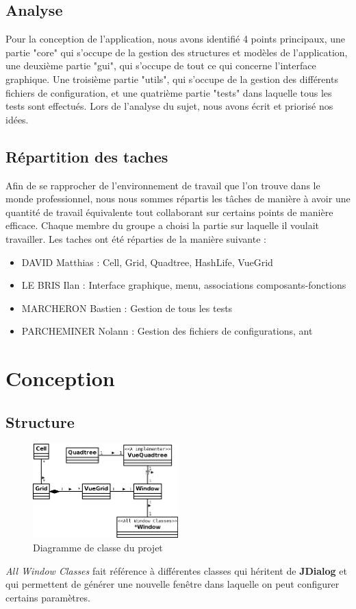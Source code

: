 \documentclass[12pt]{article}
\begin{document}
		\subsection{Analyse}
			Pour la conception de l’application, nous avons identifié 4 points principaux, une partie "core" qui s’occupe de la gestion des structures et modèles de l’application, une deuxième partie "gui", qui s’occupe de tout ce qui concerne l’interface graphique. Une troisième partie "utils", qui s'occupe de la gestion des différents fichiers de configuration, et une quatrième partie "tests" dans laquelle tous les tests sont effectués. Lors de l’analyse du sujet, nous avons écrit et priorisé nos idées.
		\subsection{Répartition des taches}
			Afin de se rapprocher de l'environnement de travail que l'on trouve dans le monde professionnel, nous nous sommes répartis les tâches de manière à avoir une quantité de travail équivalente tout collaborant sur certains points de manière efficace. Chaque membre du groupe a choisi la partie sur laquelle il voulait travailler. Les taches ont été réparties de la manière suivante :
			\begin{itemize}
				\item DAVID Matthias : Cell, Grid, Quadtree, HashLife, VueGrid
				\item LE BRIS Ilan : Interface graphique, menu, associations composants-fonctions
				\item MARCHERON Bastien : Gestion de tous les tests
				\item PARCHEMINER Nolann : Gestion des fichiers de configurations, ant
			\end{itemize}

	
	\section{Conception}
		\subsection{Structure}
			\begin{figure}[!h]
				\centering
				\includegraphics[width=0.5\textwidth]{images/diagramme.png}
				\caption{Diagramme de classe du projet}
			\end{figure}
			\emph{All Window Classes} fait référence à différentes classes qui héritent de \textbf{JDialog} et qui permettent de générer une nouvelle fenêtre dans laquelle on peut configurer certains paramètres.
		
\end{document}
